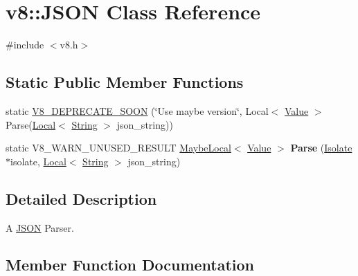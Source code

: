\hypertarget{classv8_1_1_j_s_o_n}{}\section{v8\+:\+:J\+S\+O\+N Class Reference}
\label{classv8_1_1_j_s_o_n}


{\ttfamily \#include $<$v8.\+h$>$}

\subsection*{Static Public Member Functions}
\begin{DoxyCompactItemize}
\item 
static \hyperlink{classv8_1_1_j_s_o_n_a49d405ef7c6adbf476698d23380613fc}{V8\+\_\+\+D\+E\+P\+R\+E\+C\+A\+T\+E\+\_\+\+S\+O\+O\+N} (\char`\"{}Use maybe version\char`\"{}, Local$<$ \hyperlink{classv8_1_1_value}{Value} $>$ Parse(\hyperlink{classv8_1_1_local}{Local}$<$ \hyperlink{classv8_1_1_string}{String} $>$ json\+\_\+string))
\item 
\hypertarget{classv8_1_1_j_s_o_n_ac459be02a86db2d1a7fb67ddd72023c0}{}static V8\+\_\+\+W\+A\+R\+N\+\_\+\+U\+N\+U\+S\+E\+D\+\_\+\+R\+E\+S\+U\+L\+T \hyperlink{classv8_1_1_maybe_local}{Maybe\+Local}$<$ \hyperlink{classv8_1_1_value}{Value} $>$ {\bfseries Parse} (\hyperlink{classv8_1_1_isolate}{Isolate} $\ast$isolate, \hyperlink{classv8_1_1_local}{Local}$<$ \hyperlink{classv8_1_1_string}{String} $>$ json\+\_\+string)\label{classv8_1_1_j_s_o_n_ac459be02a86db2d1a7fb67ddd72023c0}

\end{DoxyCompactItemize}


\subsection{Detailed Description}
A \hyperlink{classv8_1_1_j_s_o_n}{J\+S\+O\+N} Parser. 

\subsection{Member Function Documentation}
\hypertarget{classv8_1_1_j_s_o_n_a49d405ef7c6adbf476698d23380613fc}{}
